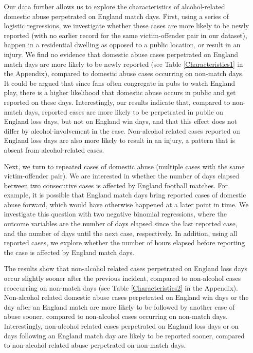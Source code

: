 \documentclass[12pt, letterpaper]{article}
\begin{document}
Our data further allows us to explore the characteristics of alcohol-related domestic abuse perpetrated on England match days. First, using a series of logistic regressions, we investigate whether these cases are more likely to be newly reported (with no earlier record for the same victim-offender pair in our dataset), happen in a residential dwelling as opposed to a public location, or result in an injury. We find no evidence that domestic abuse cases perpetrated on England match days are more likely to be newly reported (see Table \ref{Characteristics1} in the Appendix), compared to domestic abuse cases occurring on non-match days. It could be argued that since fans often congregate in pubs to watch England play, there is a higher likelihood that domestic abuse occurs in public and get reported on these days. Interestingly, our results indicate that, compared to non-match days, reported cases are more likely to be perpetrated in public on England loss days, but not on England win days, and that this effect does not differ by alcohol-involvement in the case. Non-alcohol related cases reported on England loss days are also more likely to result in an injury, a pattern that is absent from alcohol-related cases.

Next, we turn to repeated cases of domestic abuse (multiple cases with the same victim-offender pair). We are interested in whether the number of days elapsed between two consecutive cases is affected by England football matches. For example, it is possible that England match days bring reported cases of domestic abuse forward, which would have otherwise happened at a later point in time. We investigate this question with two negative binomial regressions, where the outcome variables are the number of days elapsed since the last reported case, and the number of days until the next case, respectively. In addition, using all reported cases, we explore whether the number of hours elapsed before reporting the case is affected by England match days. 

The results show that non-alcohol related cases perpetrated on England loss days occur slightly sooner after the previous incident, compared to non-alcohol cases reoccurring on non-match days (see Table \ref{Characteristics2} in the Appendix). Non-alcohol related domestic abuse cases perpetrated on England win days or the day after an England match are more likely to be followed by another case of abuse sooner, compared to non-alcohol cases occurring on non-match days. Interestingly, non-alcohol related cases perpetrated on England loss days or on days following an England match day are likely to be reported sooner, compared to non-alcohol related abuse perpetrated on non-match days. 
\end{document}
